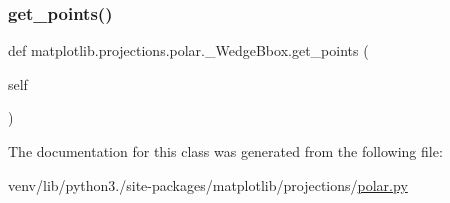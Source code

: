 \subsubsection{\texorpdfstring{get\+\_\+points()}{get\_points()}}
{\footnotesize\ttfamily def matplotlib.\+projections.\+polar.\+\_\+\+Wedge\+Bbox.\+get\+\_\+points (\begin{DoxyParamCaption}\item[{}]{self }\end{DoxyParamCaption})}



The documentation for this class was generated from the following file\+:\begin{DoxyCompactItemize}
\item 
venv/lib/python3./site-\/packages/matplotlib/projections/\hyperlink{polar_8py}{polar.\+py}\end{DoxyCompactItemize}
